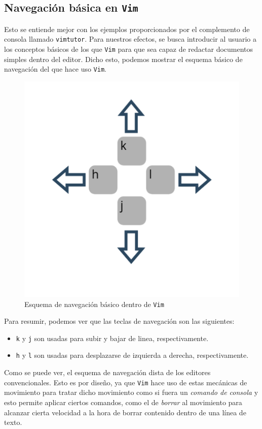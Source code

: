 \documentclass[10pt]{article}
\begin{document}
\subsection{Navegación básica en \texttt{Vim}}
Esto se entiende mejor con los ejemplos proporcionados por el complemento de consola llamado \texttt{vimtutor}. Para nuestros efectos, se busca introducir al usuario a los conceptos básicos de los que \texttt{Vim} para que sea capaz de redactar documentos simples dentro del editor. Dicho esto, podemos mostrar el esquema básico de navegación del que hace uso \texttt{Vim}.
\begin{figure}[h]
	\centering
	\includegraphics[scale=0.3]{./img/vim_nav.png}
	\caption{Esquema de navegación básico dentro de \texttt{Vim}}
\end{figure}
\newline
Para resumir, podemos ver que las teclas de navegación son las siguientes:
\begin{itemize}
	\item \texttt{k} y \texttt{j} son usadas para subir y bajar de linea, respectivamente. 
	\item \texttt{h} y \texttt{l} son usadas para desplazarse de izquierda a derecha, respectivamente. 
\end{itemize}
Como se puede ver, el esquema de navegación dista de los editores convencionales. Esto es por diseño, ya que  \texttt{Vim} hace uso de estas mecánicas de movimiento para tratar dicho movimiento como si fuera un \textit{comando de consola} y esto permite aplicar ciertos comandos, como el de \textit{borrar} al movimiento para alcanzar cierta velocidad a la hora de borrar contenido dentro de una línea de texto. 
\newpage
\end{document}
